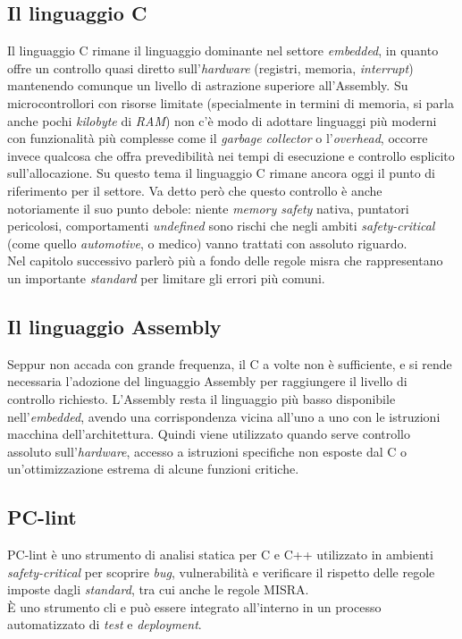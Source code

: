 \subsection{Il linguaggio C} \label{tec:lang-c}
\noindent
Il linguaggio C rimane il linguaggio dominante nel settore \textit{embedded}, in quanto offre un controllo quasi diretto sull'\textit{hardware} (registri, memoria, \textit{interrupt}) mantenendo comunque un livello di astrazione superiore all'Assembly.
Su microcontrollori con risorse limitate (specialmente in termini di memoria, si parla anche pochi \textit{kilobyte} di \textit{RAM}) non c'è modo di adottare linguaggi più moderni con funzionalità più complesse come il \textit{garbage collector} o l'\textit{overhead}, occorre invece qualcosa che offra prevedibilità nei tempi di esecuzione e controllo esplicito sull'allocazione.
Su questo tema il linguaggio C rimane ancora oggi il punto di riferimento per il settore.
Va detto però che questo controllo è anche notoriamente il suo punto debole: niente \textit{memory safety} nativa, puntatori pericolosi, comportamenti \textit{undefined} sono rischi che negli ambiti \textit{safety-critical} (come quello \textit{automotive}, o medico) vanno trattati con assoluto riguardo.\\
Nel capitolo successivo parlerò più a fondo delle regole \gls{misra} che rappresentano un importante \textit{standard} per limitare gli errori più comuni.

\subsection{Il linguaggio Assembly}
\noindent
Seppur non accada con grande frequenza, il C a volte non è sufficiente, e si rende necessaria l'adozione del linguaggio Assembly per raggiungere il livello di controllo richiesto.
L'Assembly resta il linguaggio più basso disponibile nell'\textit{embedded}, avendo una corrispondenza vicina all'uno a uno con le istruzioni macchina dell'architettura.
Quindi viene utilizzato quando serve controllo assoluto sull'\textit{hardware}, accesso a istruzioni specifiche non esposte dal C o un'ottimizzazione estrema di alcune funzioni critiche.

\subsection{PC-lint}
\noindent
PC-lint è uno strumento di analisi statica per C e C++ utilizzato in ambienti \textit{safety-critical} per scoprire \textit{bug}, vulnerabilità e verificare il rispetto delle regole imposte dagli \textit{standard}, tra cui anche le regole MISRA.\\
È uno strumento \gls{cli} e può essere integrato all'interno in un processo automatizzato di \textit{test} e \textit{deployment}.


